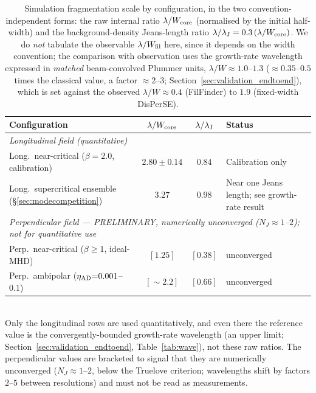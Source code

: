 \documentclass[usenatbib,twoside,twocolumn]{mnras}
\begin{document}
\begin{table}
\caption{Simulation fragmentation scale by configuration, in the two convention-independent forms: the raw internal ratio $\lambda/W_{\rm core}$ (normalised by the initial half-width) and the background-density Jeans-length ratio $\lambda/\lambda_{\rm J}=0.3\,(\lambda/W_{\rm core})$. We do \emph{not} tabulate the observable $\lambda/W_{\rm fil}$ here, since it depends on the width convention; the comparison with observation uses the growth-rate wavelength expressed in \emph{matched} beam-convolved Plummer units, $\lambda/W\approx1.0$--$1.3$ ($\approx0.35$--$0.5$ times the classical value, a factor $\approx2$--$3$; Section~\ref{sec:validation_endtoend}), which is set against the observed $\lambda/W\approx0.4$ (FilFinder) to $1.9$ (fixed-width DisPerSE).}
\label{tab:cross_campaign}
\footnotesize
\setlength{\tabcolsep}{4pt}
\begin{tabular}{lccl}
\toprule
Configuration & $\lambda/W_{\rm core}$ & $\lambda/\lambda_{\rm J}$ & Status \\
\midrule
\multicolumn{4}{l}{\emph{Longitudinal field (quantitative)}} \\
Long.\ near-critical ($\beta{=}2.0$, calibration) & $2.80{\pm}0.14$ & $0.84$ & Calibration only \\
Long.\ supercritical ensemble (\S\ref{sec:modecompetition}) & $3.27$ & $0.98$ & Near one Jeans length; see growth-rate result \\
\midrule
\multicolumn{4}{l}{\emph{Perpendicular field --- PRELIMINARY, numerically unconverged ($N_J{\approx}1$--$2$); not for quantitative use}} \\
Perp.\ near-critical ($\beta{\geq}1$, ideal-MHD) & $[1.25]$ & $[0.38]$ & unconverged \\
Perp.\ ambipolar ($\eta_{\rm AD}{=}0.001$--$0.1$) & $[{\sim}2.2]$ & $[0.66]$ & unconverged \\
\bottomrule
\end{tabular}
\\[2pt]
Only the longitudinal rows are used quantitatively, and even there the reference value is the convergently-bounded growth-rate wavelength (an upper limit; Section~\ref{sec:validation_endtoend}, Table~\ref{tab:wave}), not these raw ratios. The perpendicular values are bracketed to signal that they are numerically unconverged ($N_J\approx1$--$2$, below the Truelove criterion; wavelengths shift by factors $2$--$5$ between resolutions) and must not be read as measurements.
\end{table}
\end{document}
